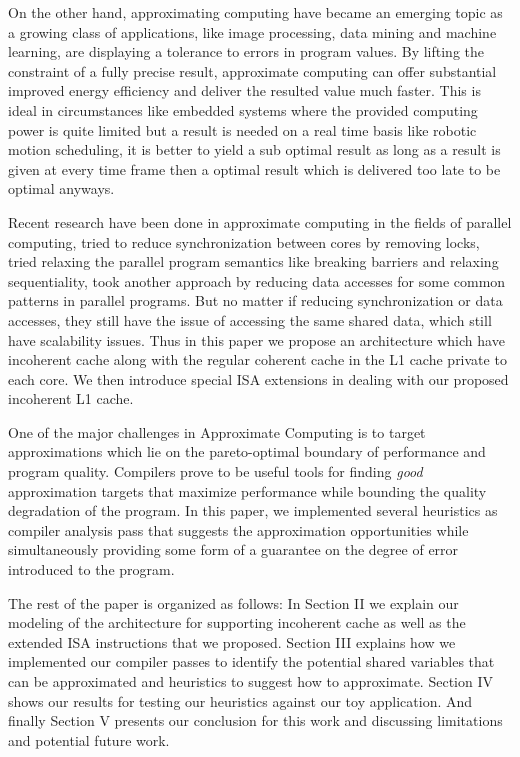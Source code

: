 \documentclass[12pt,conference]{IEEEtran}
\begin{document}
On the other hand, approximating computing have became an emerging topic
as a growing class of applications, like image processing, data mining 
and machine learning, are displaying a tolerance to errors in program values.
By lifting the constraint of a fully precise result, approximate computing
can offer substantial improved energy efficiency and deliver the resulted
value much faster. This is ideal in circumstances like embedded systems where
the provided computing power is quite limited but a result is needed on a real
time basis like robotic motion scheduling, it is better to yield a sub optimal 
result as long as a result is given at every time frame then a optimal result
which is delivered too late to be optimal anyways.

Recent research have been done in approximate computing in the fields of
parallel computing, \cite{ibm} tried to reduce synchronization between cores 
by removing locks, \cite{helixup} tried relaxing the parallel program 
semantics like breaking barriers and relaxing sequentiality, \cite{paraprox}
took another approach by reducing data accesses for some common patterns in
parallel programs. But no matter if reducing synchronization or data accesses,
they still have the issue of accessing the same shared data, which still
have scalability issues. Thus in this paper we propose an architecture which
have incoherent cache along with the regular coherent cache in the L1 cache
private to each core. We then introduce special ISA extensions in dealing with
our proposed incoherent L1 cache.

One of the major challenges in Approximate Computing is 
to target approximations which lie on the pareto-optimal
boundary of performance and program quality. Compilers prove
to be useful tools for finding \emph{good} approximation 
targets that maximize performance while bounding the
quality degradation of the program. In this paper, we implemented several 
heuristics as compiler analysis pass that suggests the approximation
opportunities while simultaneously providing some form of a guarantee on the
degree of error introduced to the program.

The rest of the paper is organized as follows: In Section II we explain our 
modeling of the architecture for supporting incoherent cache as well as the
extended ISA instructions that we proposed. Section III explains how we implemented
our compiler passes to identify the potential shared variables that can be
approximated and heuristics to suggest how to approximate. Section IV
shows our results for testing our heuristics against our toy application. And 
finally Section V presents our conclusion for this work and discussing limitations
and potential future work.
\end{document}
